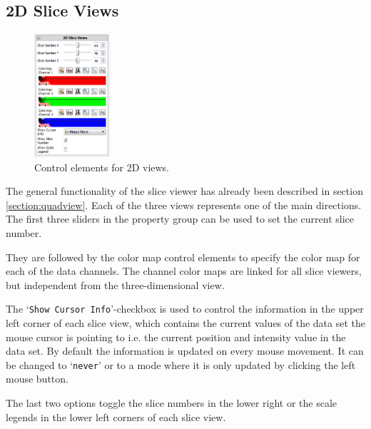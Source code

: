\subsection{2D Slice Views}
\label{section:2d_slice_views}
\begin{minipage}{\textwidth}
\begin{figure}
\vspace*{-1cm}
\centering
\includegraphics[width=0.25\textwidth]{images/32_slice_views.png}
\caption{Control elements for 2D views.}
\label{ultramicroscopy.2dslices}
\end{figure}
The general functionality of the slice viewer has already been described in section \ref{section:quadview}. Each of the three views represents one of the main directions. 
The first three sliders in the property group can be used to set the current slice number.

They are followed by the color map control elements to specify the color map for each of the data channels. The channel color maps are linked for all slice viewers, but independent from the three-dimensional view.

The `\verb|Show Cursor Info|'-checkbox is used to control the information in the upper left corner of each slice view, which contains the current values of the data set the mouse cursor is pointing to i.e. 
the current position and intensity value in the data set. By default the information is updated on every mouse movement. It can be changed to `\verb|never|' or to a mode where it is only updated by clicking 
the left mouse button.

The last two options toggle the slice numbers in the lower right or the scale legends in the lower left corners of each slice view.
\end{minipage}
\newpage
